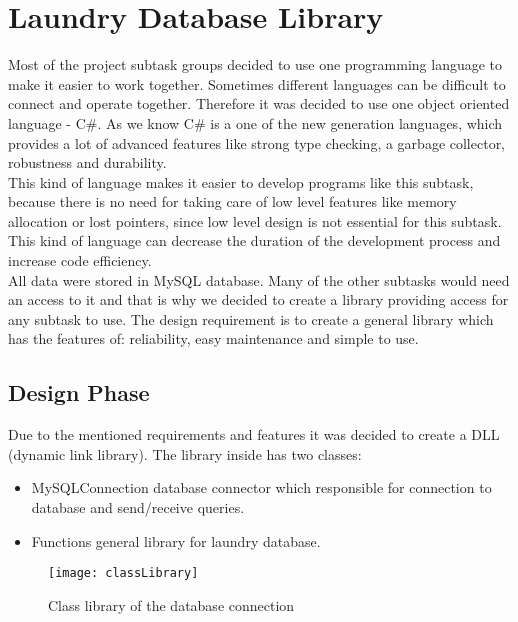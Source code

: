 %
\section{Laundry Database Library}

Most of the project subtask groups decided to use one programming language to make it easier to work together. Sometimes different languages can be difficult to connect and operate together. Therefore it was decided to use one object oriented language - C\#. As we know C\# is a one of the new generation languages, which provides a lot of advanced features like strong type checking, a garbage collector, robustness and durability. \\ This kind of language makes it easier to develop programs like this subtask, because there is no need for taking care of low level features like memory allocation or lost pointers, since low level design is not essential for this subtask. This kind of language can decrease the duration of the development process and increase code efficiency. \\

All data were stored in MySQL database. Many of the other subtasks would need an access to it and that is why we decided to create a library providing access for any subtask to use. The design requirement is to create a general library which has the features of:  reliability, easy maintenance and simple to use.

\subsection{Design Phase}

Due to the mentioned requirements and features it was decided to create a DLL (dynamic link library). The library inside has two classes:

\begin{itemize}
	\item MySQLConnection \textendash database connector which responsible for connection to database and send/receive queries.
	\item Functions \textendash general library for laundry database.
\end{itemize}

\begin{figure}[h]
	\centering
		\texttt{[image: classLibrary]}
	\caption{Class library of the database connection}
	\label{fig:planning}
\end{figure}

